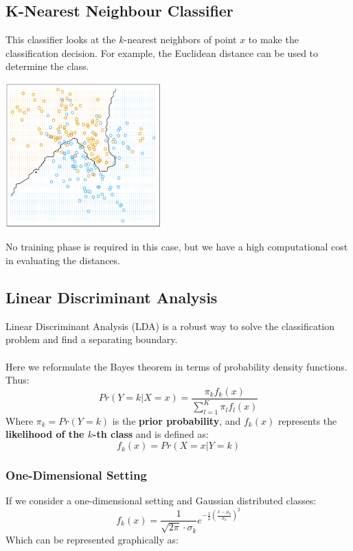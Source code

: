 \documentclass{article}
\begin{document}
\subsection{K-Nearest Neighbour Classifier}
This classifier looks at the $k$-nearest neighbors of point $x$ to make the classification decision. For example, the Euclidean distance can be used to determine the class.

\begin{center}
	\includegraphics[width=6cm]{nearest_neighbors.png}
\end{center}
No training phase is required in this case, but we have a high computational cost in evaluating the distances.

\subsection{Linear Discriminant Analysis}
Linear Discriminant Analysis (LDA) is a robust way to solve the classification problem and find a separating boundary. \\ \\
Here we reformulate the Bayes theorem in terms of probability density functions. Thus:
\[ Pr(Y = k|X = x) = \frac{\pi_kf_k(x)}{\sum^K_{l=1} \pi_lf_l(x)} \]
Where $\pi_k = Pr(Y=k)$ is the \textbf{prior probability}, and $f_k(x)$ represents the \textbf{likelihood of the $k$-th class} and is defined as:
\[ f_k(x) = Pr(X=x|Y=k) \]

\subsubsection{One-Dimensional Setting}
If we consider a one-dimensional setting and Gaussian distributed classes:
\[ f_k(x) = \frac{1}{\sqrt{2\pi} \cdot \sigma_k}e^{-\frac{1}{2}\left( \frac{x-\mu_k}{\sigma_k} \right)^2} \]
Which can be represented graphically as:
\end{document}
